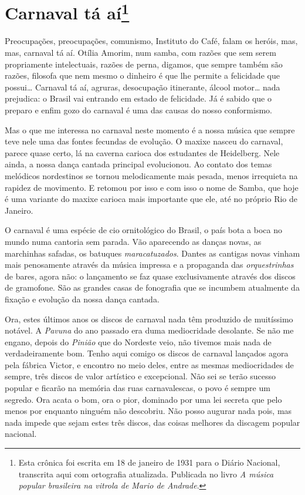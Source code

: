 \chapter{Carnaval tá aí\footnote{Esta crônica foi escrita em 18 de janeiro de 1931 para o Diário Nacional, transcrita aqui com ortografia atualizada. Publicada no livro \textit{A música popular brasileira na vitrola de Mario de Andrade}.}}

Preocupações, preocupações, comunismo, Instituto do Café, falam os
heróis, mas, mas, carnaval tá aí. Otília Amorim, num samba, com razões
que sem serem propriamente intelectuais, razões de perna, digamos, que
sempre também são razões, filosofa que nem mesmo o dinheiro é que lhe
permite a felicidade que possui\ldots{} Carnaval tá aí, agruras, desocupação
itinerante, álcool motor\ldots{} nada prejudica: o Brasil vai entrando em
estado de felicidade. Já é sabido que o preparo e enfim gozo do carnaval
é uma das causas do nosso conformismo.

Mas o que me interessa no carnaval neste momento é a nossa música que
sempre teve nele uma das fontes fecundas de evolução. O maxixe nasceu do
carnaval, parece quase certo, lá na caverna carioca dos estudantes de
Heidelberg. Nele ainda, a nossa dança cantada principal evolucionou. Ao
contato dos temas melódicos nordestinos se tornou melodicamente mais
pesada, menos irrequieta na rapidez de movimento. E retomou por isso e
com isso o nome de Samba, que hoje é uma variante do maxixe carioca mais
importante que ele, até no próprio Rio de Janeiro.

O carnaval é uma espécie de cio ornitológico do Brasil, o país bota a
boca no mundo numa cantoria sem parada. Vão aparecendo as danças novas,
as marchinhas safadas, os batuques \textit{maracatuzados}. Dantes as cantigas
novas vinham mais penosamente através da música impressa e a propaganda
das \textit{orquestrinhas} de bares, agora não: o lançamento se faz quase
exclusivamente através dos discos de gramofone. São as grandes casas de
fonografia que se incumbem atualmente da fixação e evolução da nossa
dança cantada.

Ora, estes últimos anos os discos de carnaval nada têm produzido de
muitíssimo notável. A \textit{Pavuna} do ano passado era duma mediocridade
desolante. Se não me engano, depois do \textit{Pinião} que do Nordeste
veio, não tivemos mais nada de verdadeiramente bom. Tenho aqui comigo os
discos de carnaval lançados agora pela fábrica Victor, e encontro no
meio deles, entre as mesmas mediocridades de sempre, três discos de
valor artístico e excepcional. Não sei se terão sucesso popular e
ficarão na memória das ruas carnavalescas, o povo é sempre um segredo.
Ora acata o bom, ora o pior, dominado por uma lei secreta que pelo menos
por enquanto ninguém não descobriu. Não posso augurar nada pois, mas
nada impede que sejam estes três discos, das coisas melhores da discagem
popular nacional.

